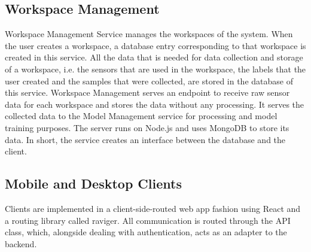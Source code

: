 \subsection{Workspace Management}
Workspace Management Service manages the workspaces of the system. When the user creates a workspace, a database entry corresponding to that workspace is created in this service. All the data that is needed for data collection and storage of a workspace, i.e. the sensors that are used in the workspace, the labels that the user created and the samples that were collected, are stored in the database of this service. Workspace Management serves an endpoint to receive raw sensor data for each workspace and stores the data without any processing. It serves the collected data to the Model Management service for processing and model training purposes. The server runs on Node.js and uses MongoDB to store its data. In short, the service creates an interface between the database and the client.

\subsection{Mobile and Desktop Clients}
Clients are implemented in a client-side-routed web app fashion using React and a routing library called raviger. All communication is routed through the API class, which, alongside dealing with authentication, acts as an adapter to the backend.

